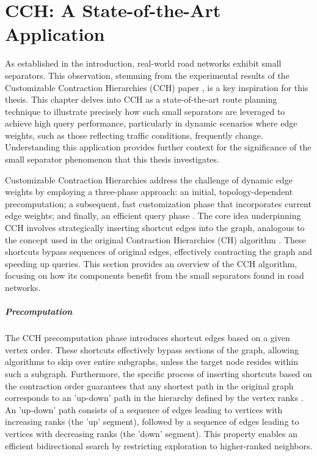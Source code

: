 \chapter{CCH: A State-of-the-Art Application}
\label{ch:cch}

As established in the introduction, real-world road networks exhibit small separators.
This observation, stemming from the experimental results of the Customizable Contraction Hierarchies (CCH) paper \cite{dibbelt_customizable_2016}, is a key inspiration for this thesis.
This chapter delves into CCH as a state-of-the-art route planning technique to illustrate precisely how such small separators are leveraged to achieve high query performance, particularly in dynamic scenarios where edge weights, such as those reflecting traffic conditions, frequently change.
Understanding this application provides further context for the significance of the small separator phenomenon that this thesis investigates.

Customizable Contraction Hierarchies address the challenge of dynamic edge weights by employing a three-phase approach: an initial, topology-dependent precomputation; a subsequent, fast customization phase that incorporates current edge weights; and finally, an efficient query phase \cite{delling_customizable_2011, dibbelt_customizable_2016}.
The core idea underpinning CCH involves strategically inserting shortcut edges into the graph, analogous to the concept used in the original Contraction Hierarchies (CH) algorithm \cite{geisberger_contraction_2008}.
These shortcuts bypass sequences of original edges, effectively contracting the graph and speeding up queries.
This section provides an overview of the CCH algorithm, focusing on how its components benefit from the small separators found in road networks.

\paragraph{Precomputation}

The CCH precomputation phase introduces shortcut edges based on a given vertex order.
These shortcuts effectively bypass sections of the graph, allowing algorithms to skip over entire subgraphs, unless the target node resides within such a subgraph.
Furthermore, the specific process of inserting shortcuts based on the contraction order guarantees that any shortest path in the original graph corresponds to an 'up-down' path in the hierarchy defined by the vertex ranks \cite{geisberger_contraction_2008}.
An 'up-down' path consists of a sequence of edges leading to vertices with increasing ranks (the 'up' segment), followed by a sequence of edges leading to vertices with decreasing ranks (the 'down' segment).
This property enables an efficient bidirectional search by restricting exploration to higher-ranked neighbors.

